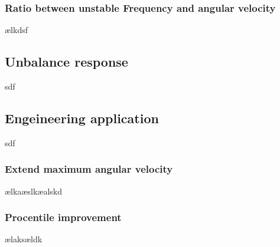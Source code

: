 \subsubsection{Ratio between unstable Frequency and angular velocity}
ælkdsf
\subsection{Unbalance response}
sdf
\subsection{Engeineering application}
sdf
\subsubsection{Extend maximum angular velocity}
ælkaæslkæalskd
\subsubsection{Procentile improvement}
ælaksældk